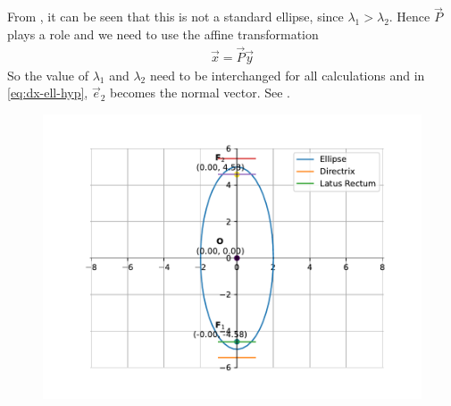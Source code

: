From , it can be seen that this is not a standard ellipse, since $\lambda_1 > \lambda_2$.  Hence $\vec{P}$ plays a role and we need to use the affine transformation
\begin{align}
\vec{x} = \vec{P}\vec{y}
\end{align}
So the value of $\lambda_1$ and $\lambda_2$ need to be interchanged for all calculations and 
in
					\eqref{eq:dx-ell-hyp},
					$\vec{e}_2$ becomes the normal vector.
See .
\begin{figure}[H]
	\begin{center} 
	    \includegraphics[width=0.75\columnwidth]{chapters/11/11/3/2/figs/fig.pdf}
	\end{center}
\caption{}
\label{fig:chapters/11/11/3/2/Fig1}
\end{figure}
